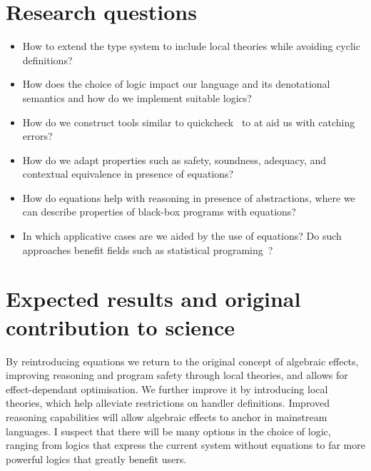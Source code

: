 \documentclass{article}
\begin{document}
\section*{Research questions}

\begin{itemize}
  \item How to extend the type system to include local theories while avoiding cyclic definitions?
  \item How does the choice of logic impact our language and its denotational semantics and how do we implement suitable logics?
  \item How do we construct tools similar to quickcheck~\cite{DBLP:conf/icfp/ClaessenH00} to at aid us with catching errors?
  \item How do we adapt properties such as safety, soundness, adequacy, and contextual equivalence in presence of equations?
  \item How do equations help with reasoning in presence of abstractions, where we can describe properties of black-box programs with equations?
  \item In which applicative cases are we aided by the use of equations?  Do such approaches benefit fields such as statistical programing~\cite{DBLP:journals/pacmpl/VakarKS19}?
\end{itemize}



\section*{Expected results and original contribution to science}

By reintroducing equations we return to the original concept of algebraic effects, improving reasoning and program safety through local theories, and allows for effect-dependant optimisation. We further improve it by introducing local theories, which help alleviate restrictions on handler definitions. Improved reasoning capabilities will allow algebraic effects to anchor in mainstream languages. I suspect that there will be many options in the choice of logic, ranging from logics that express the current system without equations to far more powerful logics that greatly benefit users. 



\end{document}
